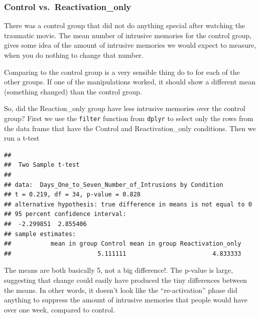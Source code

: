 \documentclass[]{book}
\newenvironment{Shaded}{\begin{snugshade}}{\end{snugshade}}
\newcommand{\KeywordTok}[1]{\textcolor[rgb]{0.13,0.29,0.53}{\textbf{{#1}}}}
\newcommand{\DataTypeTok}[1]{\textcolor[rgb]{0.13,0.29,0.53}{{#1}}}
\newcommand{\StringTok}[1]{\textcolor[rgb]{0.31,0.60,0.02}{{#1}}}
\newcommand{\OtherTok}[1]{\textcolor[rgb]{0.56,0.35,0.01}{{#1}}}
\newcommand{\NormalTok}[1]{{#1}}
\theoremstyle{definition}
\theoremstyle{definition}
\theoremstyle{definition}
\theoremstyle{remark}
\begin{document}
\subsubsection{Control
vs.~Reactivation\_only}\label{control-vs.reactivation_only}

There was a control group that did not do anything special after
watching the traumatic movie. The mean number of intrusive memories for
the control group, gives some idea of the amount of intrusive memories
we would expect to measure, when you do nothing to change that number.

Comparing to the control group is a very sensible thing do to for each
of the other groups. If one of the manipulations worked, it should show
a different mean (something changed) than the control group.

So, did the Reaction\_only group have less intrusive memories over the
control group? First we use the \texttt{filter} function from
\texttt{dplyr} to select only the rows from the data frame that have the
Control and Reactivation\_only conditions. Then we run a t-test

\begin{Shaded}
\end{Shaded}

\begin{verbatim}
## 
##  Two Sample t-test
## 
## data:  Days_One_to_Seven_Number_of_Intrusions by Condition
## t = 0.219, df = 34, p-value = 0.828
## alternative hypothesis: true difference in means is not equal to 0
## 95 percent confidence interval:
##  -2.299851  2.855406
## sample estimates:
##           mean in group Control mean in group Reactivation_only 
##                        5.111111                        4.833333
\end{verbatim}

The means are both basically 5, not a big difference!. The p-value is
large, suggesting that change could easily have produced the tiny
differences between the means. In other words, it doesn't look like the
``re-activation'' phase did anything to suppress the amount of intrusive
memories that people would have over one week, compared to control.
\end{document}
